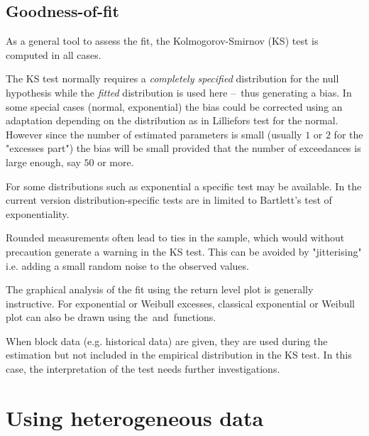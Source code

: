 \documentclass[a4paper]{report}
\begin{document}
\subsection{Goodness-of-fit}
As a general tool to assess the fit, the Kolmogorov-Smirnov (KS) test
is computed in all cases. 

The KS test normally requires a \textit{completely specified} distribution 
for the null hypothesis while the \textit{fitted} distribution is used here 
--~thus generating a bias. In some special cases (normal, exponential) the bias 
could be corrected using an adaptation depending on the distribution as in
Lilliefors test for the normal. However since the number of estimated parameters 
is small (usually $1$ or $2$ for the "excesses part") the bias will be small 
provided that the number of exceedances is large enough, say $50$ or more. 

For some distributions such as exponential a specific test may be
available.  In the current version distribution-specific tests are in
\verb@Renouv@ limited to Bartlett's test of exponentiality.

Rounded measurements often lead to ties in the sample, which
  
would without precaution generate a warning in the KS test.
This can be avoided by "jitterising" i.e. adding a small random noise
to the observed values.

The  graphical analysis of the fit using the return level plot is generally 
instructive. For  exponential or Weibull excesses, classical exponential or
Weibull plot can also be drawn using the~\verb@expplot@ and~\verb@weibplot@ functions. 
%

When block data (e.g. historical data) are given, they are used during
the estimation but not included in the empirical distribution in the
KS test. In this case, the interpretation of the test needs further
investigations.  



\section{Using heterogeneous data}
\label{SECHISTORY}
\end{document}

